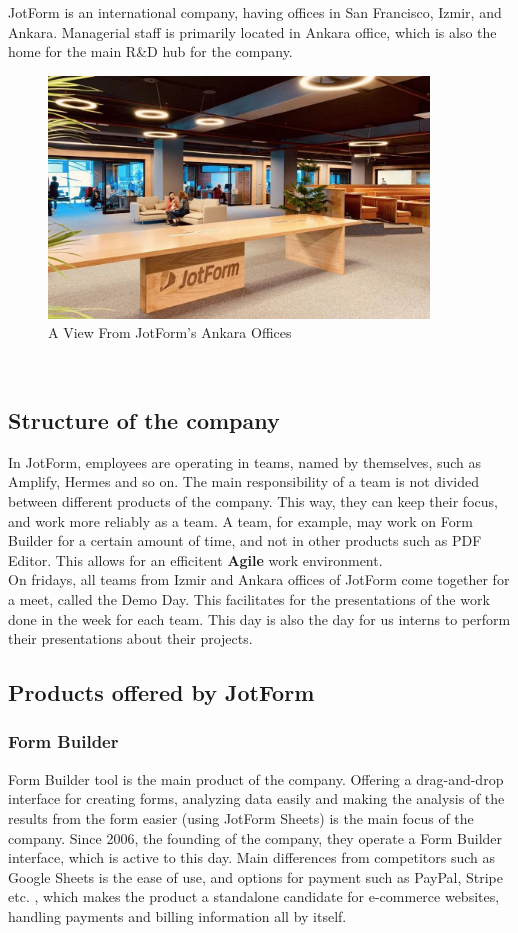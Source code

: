 JotForm is an international company, having offices in San Francisco, Izmir, and Ankara. Managerial
staff is primarily located in Ankara office, which is also the home for the main R\&D hub for the company. \\
\begin{figure}[hbt!]
    \centering
    \includegraphics[width=0.9\textwidth]{Images/new-turkey-office.jpg}
    \caption{A View From JotForm's Ankara Offices}
    \label{fig:JFMAnkara}
\end{figure} \\
\subsection{Structure of the company}
In JotForm, employees are operating in teams, named by themselves, such as Amplify, Hermes and so on. The main responsibility of a team is not divided between different products of the company. This way, they can keep their focus, and work more reliably as a team. A team, for example, may work on Form Builder for a certain amount of time, and not in other products such as PDF Editor. This allows for an efficitent \textbf{Agile} work environment. \\
On fridays, all teams from Izmir and Ankara offices of JotForm come together for a meet, called the Demo Day. This facilitates for the presentations of the work done in the week for each team. This day is also the day for us interns to perform their presentations about their projects.

\subsection{Products offered by JotForm}
\subsubsection{Form Builder}
Form Builder tool is the main product of the company. Offering a drag-and-drop interface for creating forms,
analyzing data easily and making the analysis of the results from the form easier (using JotForm Sheets) is the main focus of the company. Since 2006, the founding of the company, they operate a Form Builder interface, which is active to this day. Main differences from competitors such as Google Sheets is the ease of use, and options for payment such as PayPal, Stripe etc. , which makes the product a standalone candidate for e-commerce websites, handling payments and billing information all by itself.


